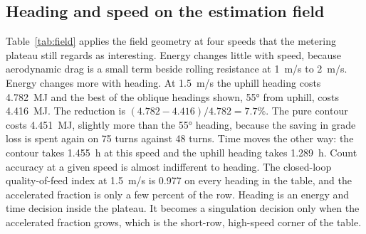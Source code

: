 \subsection{Heading and speed on the estimation field}

Table~\ref{tab:field} applies the field geometry at four speeds that the metering plateau still regards as interesting. Energy changes little with speed, because aerodynamic drag is a small term beside rolling resistance at \SI{1}{m/s} to \SI{2}{m/s}. Energy changes more with heading. At \SI{1.5}{m/s} the uphill heading costs \SI{4.782}{MJ} and the best of the oblique headings shown, \ang{55} from uphill, costs \SI{4.416}{MJ}. The reduction is \((4.782-4.416)/4.782=\num{7.7}\%\). The pure contour costs \SI{4.451}{MJ}, slightly more than the \ang{55} heading, because the saving in grade loss is spent again on \num{75} turns against \num{48} turns. Time moves the other way: the contour takes \SI{1.455}{h} at this speed and the uphill heading takes \SI{1.289}{h}. Count accuracy at a given speed is almost indifferent to heading. The closed-loop quality-of-feed index at \SI{1.5}{m/s} is \num{0.977} on every heading in the table, and the accelerated fraction is only a few percent of the row. Heading is an energy and time decision inside the plateau. It becomes a singulation decision only when the accelerated fraction grows, which is the short-row, high-speed corner of the table.

